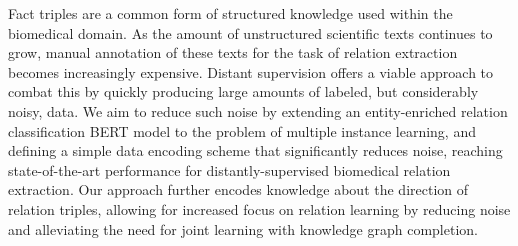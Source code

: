 Fact triples are a common form of structured knowledge used within the biomedical domain. As the amount of unstructured scientific texts continues to grow, manual annotation of these texts for the task of relation extraction becomes increasingly expensive. Distant supervision offers a viable approach to combat this by quickly producing large amounts of labeled, but considerably noisy, data. We aim to reduce such noise by extending an entity-enriched relation classification BERT model to the problem of multiple instance learning, and defining a simple data encoding scheme that significantly reduces noise, reaching state-of-the-art performance for distantly-supervised biomedical relation extraction. Our approach further encodes knowledge about the direction of relation triples, allowing for increased focus on relation learning by reducing noise and alleviating the need for joint learning with knowledge graph completion.
